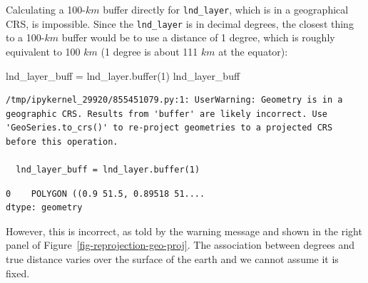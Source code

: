 \documentclass[
  letterpaper,
]{krantz}
\newenvironment{Shaded}{\begin{snugshade}}{\end{snugshade}}
\newcommand{\BuiltInTok}[1]{\textcolor[rgb]{0.00,0.23,0.31}{#1}}
\newcommand{\DecValTok}[1]{\textcolor[rgb]{0.68,0.00,0.00}{#1}}
\newcommand{\NormalTok}[1]{\textcolor[rgb]{0.00,0.23,0.31}{#1}}
\newcommand{\OperatorTok}[1]{\textcolor[rgb]{0.37,0.37,0.37}{#1}}
\begin{document}
Calculating a 100-\(km\) buffer directly for \texttt{lnd\_layer}, which
is in a geographical CRS, is impossible. Since the \texttt{lnd\_layer}
is in decimal degrees, the closest thing to a 100-\(km\) buffer would be
to use a distance of 1 degree, which is roughly equivalent to 100 \(km\)
(1 degree is about 111 \(km\) at the equator):

\begin{Shaded}
\begin{Highlighting}[]
\NormalTok{lnd\_layer\_buff }\OperatorTok{=}\NormalTok{ lnd\_layer.}\BuiltInTok{buffer}\NormalTok{(}\DecValTok{1}\NormalTok{)}
\NormalTok{lnd\_layer\_buff}
\end{Highlighting}
\end{Shaded}

\begin{verbatim}
/tmp/ipykernel_29920/855451079.py:1: UserWarning: Geometry is in a geographic CRS. Results from 'buffer' are likely incorrect. Use 'GeoSeries.to_crs()' to re-project geometries to a projected CRS before this operation.

  lnd_layer_buff = lnd_layer.buffer(1)
\end{verbatim}

\begin{verbatim}
0    POLYGON ((0.9 51.5, 0.89518 51....
dtype: geometry
\end{verbatim}

However, this is incorrect, as told by the warning message and shown in
the right panel of Figure~\ref{fig-reprojection-geo-proj}. The
association between degrees and true distance varies over the surface of
the earth and we cannot assume it is fixed.
\end{document}
